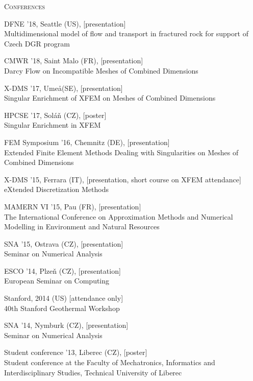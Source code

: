 \documentclass[bibliography=totocnumbered,dvipsnames,FM,Dis, EN]{tulthesis_autoreferat}
\begin{document}
\vspace{0.5cm}
%
{\noindent\large\textsc{Conferences}}
%
\begin{itemize}[label={}, leftmargin=*]
{\small
\item DFNE '18, Seattle (US), [presentation] \\ Multidimensional model of flow and transport in fractured
rock for support of Czech DGR program
\item CMWR '18, Saint Malo (FR), [presentation] \\ Darcy Flow on Incompatible Meshes of
Combined Dimensions
\item X-DMS '17, Ume\aa (SE), [presentation] \\ Singular Enrichment of XFEM on Meshes of
Combined Dimensions
\item HPCSE '17, Sol\'a{\v n} (CZ), [poster] \\ Singular Enrichment in XFEM
\item FEM Symposium '16, Chemnitz (DE), [presentation] \\ Extended Finite Element Methods Dealing with Singularities on Meshes of Combined Dimensions
\item X-DMS '15, Ferrara (IT), [presentation, short course on XFEM attendance]\\ eXtended Discretization Methods
\item MAMERN VI '15, Pau (FR), [presentation] \\ The International Conference on Approximation Methods and Numerical Modelling in Environment and Natural Resources
\item SNA '15, Ostrava (CZ), [presentation] \\ Seminar on Numerical Analysis
\item ESCO '14, Plze{\v n} (CZ), [presentation] \\ European Seminar on Computing
\item Stanford, 2014 (US) [attendance only] \\ 40th Stanford Geothermal Workshop
\item SNA '14, Nymburk (CZ), [presentation] \\ Seminar on Numerical Analysis
\item Student conference '13, Liberec (CZ), [poster] \\
Student conference at the Faculty of Mechatronics, Informatics and Interdisciplinary Studies, Technical University of Liberec
}
\end{itemize}




\newpage
{\small

% 

}
\end{document}
